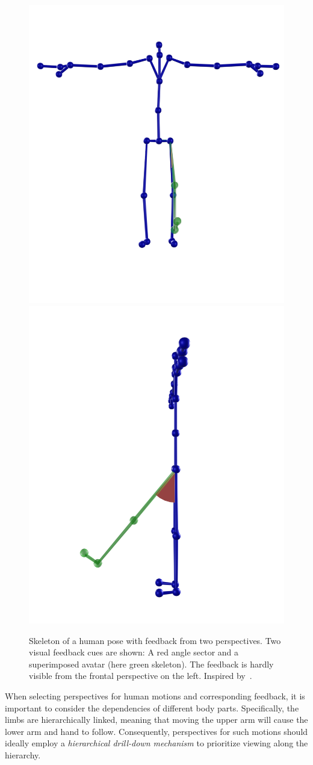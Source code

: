 \begin{figure}[ht]
	\centering
	\includegraphics[width=0.49\linewidth]{pictures/feedbackFront.png}
	\includegraphics[width=0.49\linewidth]{pictures/feedbackSide.png}
	\caption{Skeleton of a human pose with feedback from two perspectives. Two visual feedback cues are shown: A red angle sector and a superimposed avatar (here green skeleton). The feedback is hardly visible from the frontal perspective on the left. Inspired by~\cite{diller2024automatic}.}
	\label{fig:skeletonFeedbackPerspective}
\end{figure}

When selecting perspectives for human motions and corresponding feedback, it is important to consider the dependencies of different body parts. Specifically, the limbs are hierarchically linked, meaning that moving the upper arm will cause the lower arm and hand to follow. Consequently, perspectives for such motions should ideally employ a \emph{hierarchical drill-down mechanism} to prioritize viewing along the hierarchy.

